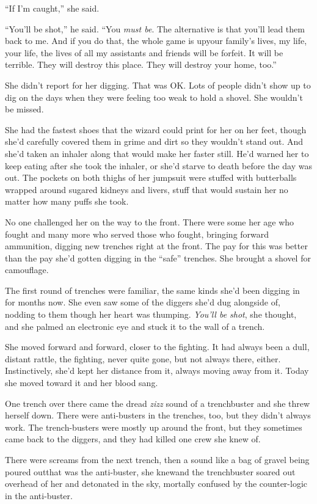 “If I’m caught,” she said.

“You’ll be shot,” he said. “You \emph{must be}. The alternative is
that you’ll lead them back to me. And if you do that, the whole
game is up\dash{}your family’s lives, my life, your life, the lives of
all my assistants and friends will be forfeit. It will be terrible.
They will destroy this place. They will destroy your home, too.”

She didn’t report for her digging. That was OK. Lots of people
didn’t show up to dig on the days when they were feeling too weak
to hold a shovel. She wouldn’t be missed.

She had the fastest shoes that the wizard could print for her on
her feet, though she’d carefully covered them in grime and dirt so
they wouldn’t stand out. And she’d taken an inhaler along that
would make her faster still. He’d warned her to keep eating after
she took the inhaler, or she’d starve to death before the day was
out. The pockets on both thighs of her jumpsuit were stuffed with
butterballs wrapped around sugared kidneys and livers, stuff that
would sustain her no matter how many puffs she took.

No one challenged her on the way to the front. There were some her
age who fought and many more who served those who fought, bringing
forward ammunition, digging new trenches right at the front. The
pay for this was better than the pay she’d gotten digging in the
“safe” trenches. She brought a shovel for camouflage.

The first round of trenches were familiar, the same kinds she’d
been digging in for months now. She even saw some of the diggers
she’d dug alongside of, nodding to them though her heart was
thumping. \emph{You’ll be shot}, she thought, and she palmed an
electronic eye and stuck it to the wall of a trench.

She moved forward and forward, closer to the fighting. It had
always been a dull, distant rattle, the fighting, never quite gone,
but not always there, either. Instinctively, she’d kept her
distance from it, always moving away from it. Today she moved
toward it and her blood sang.

One trench over there came the dread \emph{zizz} sound of a
trenchbuster and she threw herself down. There were anti-busters in
the trenches, too, but they didn’t always work. The trench-busters
were mostly up around the front, but they sometimes came back to
the diggers, and they had killed one crew she knew of.

There were screams from the next trench, then a sound like a bag of
gravel being poured out\dash{}that was the anti-buster, she knew\dash{}and the
trenchbuster soared out overhead of her and detonated in the sky,
mortally confused by the counter-logic in the anti-buster.

